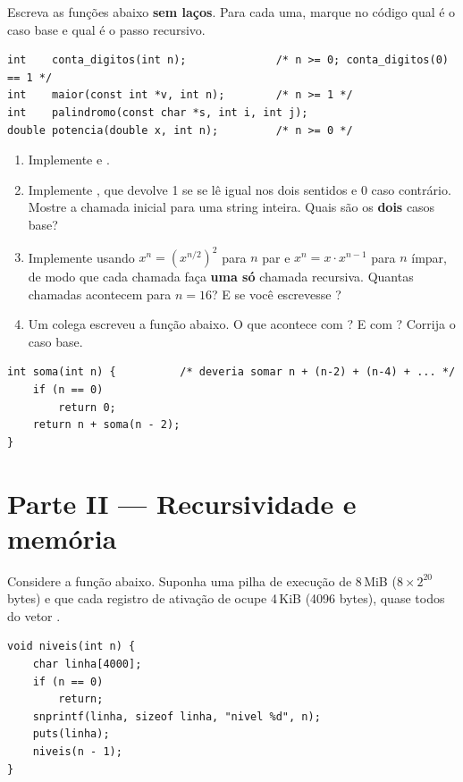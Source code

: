 \documentclass[11pt,a4paper]{article}
\begin{document}
Escreva as funções abaixo \textbf{sem laços}. Para cada uma, marque no código qual é
o caso base e qual é o passo recursivo.

\begin{lstlisting}
int    conta_digitos(int n);              /* n >= 0; conta_digitos(0) == 1 */
int    maior(const int *v, int n);        /* n >= 1 */
int    palindromo(const char *s, int i, int j);
double potencia(double x, int n);         /* n >= 0 */
\end{lstlisting}

\begin{enumerate}[label=(\alph*),leftmargin=1.8em,itemsep=1pt]
  \item Implemente  e .
  \item Implemente , que devolve 1 se  se lê igual nos
        dois sentidos e 0 caso contrário. Mostre a chamada inicial para uma string
         inteira. Quais são os \textbf{dois} casos base?
  \item Implemente  usando $x^n = (x^{n/2})^2$ para $n$ par e
        $x^n = x \cdot x^{n-1}$ para $n$ ímpar, de modo que cada chamada faça
        \textbf{uma só} chamada recursiva. Quantas chamadas acontecem para
        $n = 16$? E se você escrevesse ?
  \item Um colega escreveu a função abaixo. O que acontece com ? E com
        ? Corrija o caso base.
\end{enumerate}

\begin{lstlisting}
int soma(int n) {          /* deveria somar n + (n-2) + (n-4) + ... */
    if (n == 0)
        return 0;
    return n + soma(n - 2);
}
\end{lstlisting}

\section{Parte II --- Recursividade e memória}

Considere a função abaixo. Suponha uma pilha de execução de 8\,MiB
($8 \times 2^{20}$ bytes) e que cada registro de ativação de  ocupe
4\,KiB (4096 bytes), quase todos do vetor .

\begin{lstlisting}
void niveis(int n) {
    char linha[4000];
    if (n == 0)
        return;
    snprintf(linha, sizeof linha, "nivel %d", n);
    puts(linha);
    niveis(n - 1);
}
\end{lstlisting}
\end{document}
